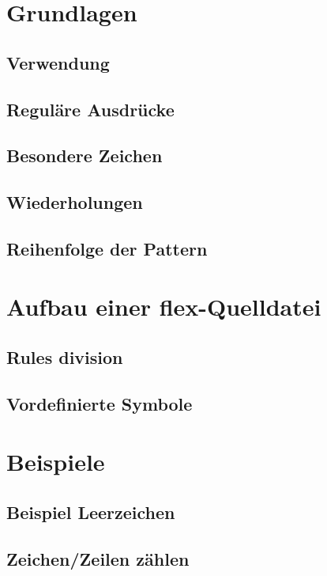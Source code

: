 \section{Grundlagen}
\subsection{Verwendung}
\subsection{Reguläre Ausdrücke}
\subsection{Besondere Zeichen}
\subsection{Wiederholungen}
\subsection{Reihenfolge der Pattern}

\section{Aufbau einer flex-Quelldatei}
\subsection{Rules division}
\subsection{Vordefinierte Symbole}

\section{Beispiele}
\subsection{Beispiel Leerzeichen}
\subsection{Zeichen/Zeilen zählen}

